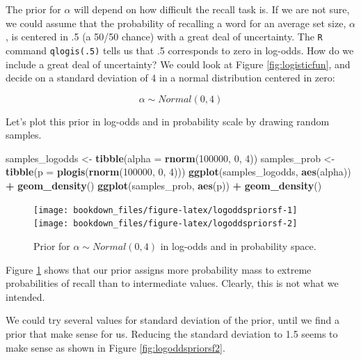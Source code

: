 \documentclass[12pt,]{krantz}
\newenvironment{Shaded}{\begin{snugshade}}{\end{snugshade}}
\newcommand{\KeywordTok}[1]{\textcolor[rgb]{0.13,0.29,0.53}{\textbf{#1}}}
\newcommand{\DataTypeTok}[1]{\textcolor[rgb]{0.13,0.29,0.53}{#1}}
\newcommand{\DecValTok}[1]{\textcolor[rgb]{0.00,0.00,0.81}{#1}}
\newcommand{\StringTok}[1]{\textcolor[rgb]{0.31,0.60,0.02}{#1}}
\newcommand{\OperatorTok}[1]{\textcolor[rgb]{0.81,0.36,0.00}{\textbf{#1}}}
\newcommand{\NormalTok}[1]{#1}
\theoremstyle{definition}
\theoremstyle{definition}
\theoremstyle{definition}
\theoremstyle{remark}
\begin{document}
The prior for \(\alpha\) will depend on how difficult the recall task
is. If we are not sure, we could assume that the probability of
recalling a word for an average set size, \(\alpha\), is centered in .5
(a 50/50 chance) with a great deal of uncertainty. The \texttt{R}
command \texttt{qlogis(.5)} tells us that .5 corresponds to zero in
log-odds. How do we include a great deal of uncertainty? We could look
at Figure \ref{fig:logisticfun}, and decide on a standard deviation of 4
in a normal distribution centered in zero:

\begin{equation}
\alpha \sim Normal(0, 4) 
\end{equation}

Let's plot this prior in log-odds and in probability scale by drawing
random samples.




\begin{Shaded}
\begin{Highlighting}[]
\NormalTok{samples_logodds <-}\StringTok{ }\KeywordTok{tibble}\NormalTok{(}\DataTypeTok{alpha =} \KeywordTok{rnorm}\NormalTok{(}\DecValTok{100000}\NormalTok{, }\DecValTok{0}\NormalTok{, }\DecValTok{4}\NormalTok{))}
\NormalTok{samples_prob <-}\StringTok{ }\KeywordTok{tibble}\NormalTok{(}\DataTypeTok{p =} \KeywordTok{plogis}\NormalTok{(}\KeywordTok{rnorm}\NormalTok{(}\DecValTok{100000}\NormalTok{, }\DecValTok{0}\NormalTok{, }\DecValTok{4}\NormalTok{)))}
\KeywordTok{ggplot}\NormalTok{(samples_logodds, }\KeywordTok{aes}\NormalTok{(alpha)) }\OperatorTok{+}
\StringTok{    }\KeywordTok{geom_density}\NormalTok{()}
\KeywordTok{ggplot}\NormalTok{(samples_prob, }\KeywordTok{aes}\NormalTok{(p)) }\OperatorTok{+}
\StringTok{    }\KeywordTok{geom_density}\NormalTok{()}
\end{Highlighting}
\end{Shaded}

\begin{figure}
\texttt{[image: bookdown\_files/figure-latex/logoddspriorsf-1]} \texttt{[image: bookdown\_files/figure-latex/logoddspriorsf-2]} \caption{Prior for \(\alpha \sim Normal(0, 4)\) in log-odds
and in probability space.}\label{fig:logoddspriorsf}
\end{figure}

Figure \ref{fig:logoddspriorsf} shows that our prior assigns more
probability mass to extreme probabilities of recall than to intermediate
values. Clearly, this is not what we intended.

We could try several values for standard deviation of the prior, until
we find a prior that make sense for us. Reducing the standard deviation
to 1.5 seems to make sense as shown in Figure \ref{fig:logoddspriorsf2}.
\end{document}
